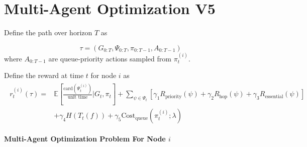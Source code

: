 \documentclass{article}
\begin{document}
\section{Multi-Agent Optimization V5}


Define the path over horizon $T$ as

$$
\tau = (G_{0:T}, \Psi_{0:T}, \pi_{0:T-1}, A_{0:T-1})
$$
where $A_{0:T-1}$ are queue-priority actions sampled from $\pi_{t}^{(i)}$.

Define the reward at time $t$ for node $i$ as
\begin{align*}
    \begin{split}
            r_{t}^{(i)} (\tau)  =
            &\mathbb{E}[\frac{\text{card}(\Psi_{t}^{(i)})}{\text{unit time}} | G_{t}, \pi_{t}] + \sum_{\psi \in \Psi_{t}}[ \gamma_{1} R_{\text{priority}}(\psi) + \gamma_{2} R_{\text{hop}}(\psi)  +  \gamma_{3} R_{\text{essential}}(\psi)]
            \\ &+ \gamma_{4} H(T_{t}(f)) + \gamma_{5} \text{Cost}_{\text{queue}}(\pi_{t}^{(i)}; \lambda)
    \end{split}
\end{align*}\nonumber


\noindent \textbf{Multi-Agent Optimization Problem For Node $i$}
\\
\noindent{}

\vspace{1 cm}
\end{document}
